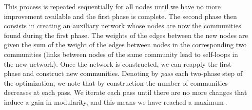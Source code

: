 This process is repeated sequentially for all nodes until we have no more improvement available and the first phase is complete.
The second phase then consists in creating an auxiliary network whose nodes are now the communities found during the first phase. The weights of the edges between the new nodes are given the sum of the weight of the edges between nodes in the corresponding two communities (links between nodes of the same community lead to self-loops in the new network). Once the network is constructed, we can reapply the first phase and construct new communities. Denoting by \textit{pass} each two-phase step of the optimization, we note that by construction the number of communities decreases at each pass. We iterate each pass until there are no more changes that induce a gain in modularity, and this means we have reached a maximum \cite{blondel2008louvain}.


\pagebreak
